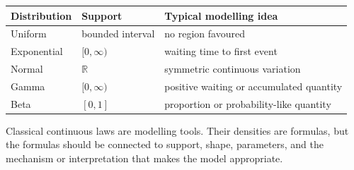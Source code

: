 \begin{center}
\begin{tabular}{lll}
\toprule
Distribution & Support & Typical modelling idea \\
\midrule
Uniform & bounded interval & no region favoured \\
Exponential & \([0,\infty)\) & waiting time to first event \\
Normal & \(\mathbb{R}\) & symmetric continuous variation \\
Gamma & \([0,\infty)\) & positive waiting or accumulated quantity \\
Beta & \([0,1]\) & proportion or probability-like quantity \\
\bottomrule
\end{tabular}
\end{center}

\begin{summarybox}
Classical continuous laws are modelling tools. Their densities are formulas, but
the formulas should be connected to support, shape, parameters, and the mechanism
or interpretation that makes the model appropriate.
\end{summarybox}
